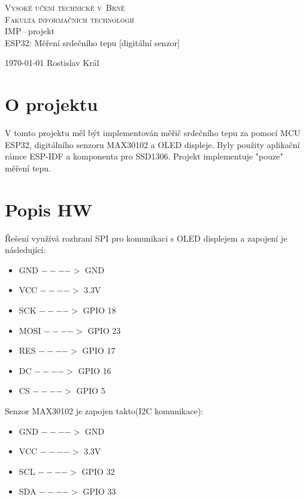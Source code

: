 \documentclass{article}
\begin{document}
\begin{titlepage}
		\begin{center}
			\Huge\textsc{Vysoké učení technické v~Brně} \\
			\huge\textsc{Fakulta informačních technologií} \\
			\LARGE IMP\,--\,projekt \\
			\Huge ESP32: Měření srdečního tepu [digitální senzor] 
		\end{center}


		{\Large
			\today\hfill
			Rostislav Král
		}
	\end{titlepage}

\section{O projektu}
V tomto projektu měl být implementován měřič srdečního tepu za pomocí MCU ESP32, digitálního senzoru MAX30102 a OLED displeje. Byly použity aplikační rámce ESP-IDF a komponenta pro SSD1306. Projekt implementuje "pouze"  měření tepu.
\section{Popis HW}
Řešení využívá rozhraní SPI pro komunikaci s OLED displejem a zapojení je následující:

\begin{itemize}
    \item GND $---->$ GND
    \item VCC $---->$ 3.3V
    \item SCK $---->$ GPIO 18
    \item MOSI $---->$ GPIO 23
    \item RES $---->$ GPIO 17
    \item DC $---->$ GPIO 16
    \item CS $---->$ GPIO 5
\end{itemize}

Senzor MAX30102 je zapojen takto(I2C komunikace):

\begin{itemize}
    \item GND $---->$ GND
    \item VCC $---->$ 3.3V
    \item SCL $---->$ GPIO 32
    \item SDA $---->$ GPIO 33

\end{itemize}
\end{document}
